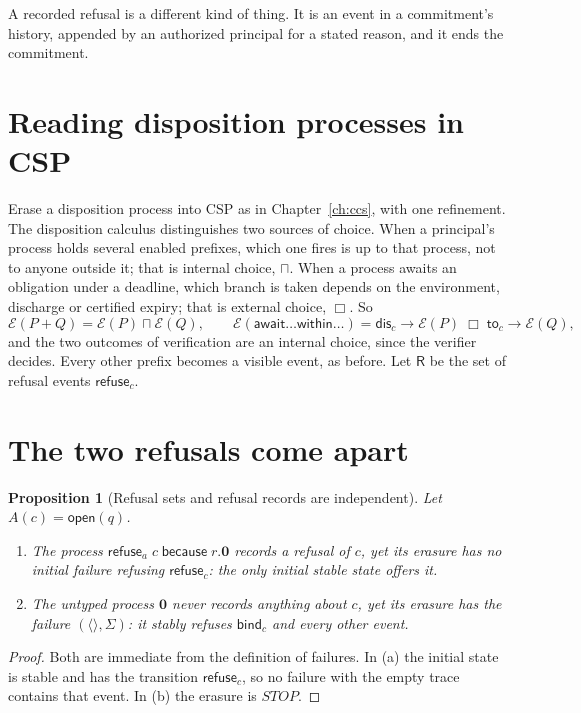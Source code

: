 \documentclass[11pt,openany]{book}
\newtheorem{proposition}[theorem]{Proposition}
\theoremstyle{remark}
\begin{document}
A recorded refusal is a different kind of thing. It is an event in a
commitment's history, appended by an authorized principal for a stated
reason, and it ends the commitment.

\section{Reading disposition processes in CSP}

Erase a disposition process into CSP as in Chapter~\ref{ch:ccs}, with one
refinement. The disposition calculus distinguishes two sources of choice.
When a principal's process holds several enabled prefixes, which one fires
is up to that process, not to anyone outside it; that is internal choice,
$\sqcap$. When a process awaits an obligation under a deadline, which
branch is taken depends on the environment, discharge or certified
expiry; that is external choice, $\Box$. So
\[
\mathcal E(P+Q)=\mathcal E(P)\sqcap\mathcal E(Q),\qquad
\mathcal E(\mathsf{await}\ldots\mathsf{within}\ldots)=
\mathsf{dis}_c\to\mathcal E(P)\;\Box\;\mathsf{to}_c\to\mathcal E(Q),
\]
and the two outcomes of verification are an internal choice, since the
verifier decides. Every other prefix becomes a visible event, as before.
Let $\mathsf R$ be the set of refusal events $\mathsf{refuse}_c$.

\section{The two refusals come apart}

\begin{proposition}[Refusal sets and refusal records are independent]
\label{prop:twofusals}
Let $A(c)=\mathsf{open}(q)$.
\begin{enumerate}[label=(\alph*)]
\item The process $\mathsf{refuse}_a\;c\;\mathsf{because}\;r.\mathbf 0$ records
a refusal of $c$, yet its erasure has no initial failure refusing
$\mathsf{refuse}_c$: the only initial stable state offers it.
\item The untyped process $\mathbf 0$ never records anything about $c$,
yet its erasure has the failure $(\langle\rangle,\Sigma)$: it stably
refuses $\mathsf{bind}_c$ and every other event.
\end{enumerate}
\end{proposition}

\begin{proof}
Both are immediate from the definition of failures. In (a) the initial
state is stable and has the transition $\mathsf{refuse}_c$, so no failure
with the empty trace contains that event. In (b) the erasure is
$\mathit{STOP}$.
\end{proof}
\end{document}
